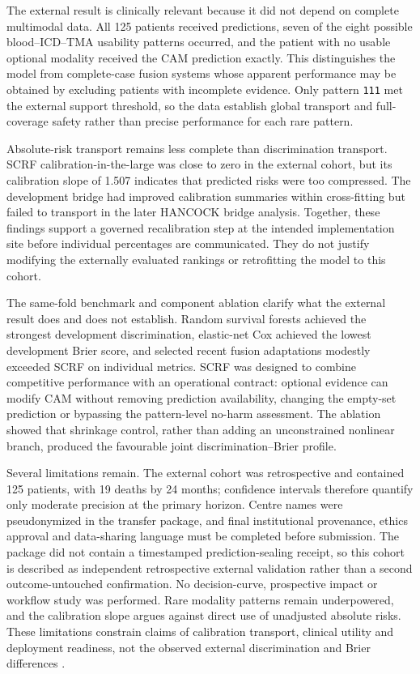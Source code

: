 \documentclass[pdflatex,sn-nature]{sn-jnl}
\begin{document}
The external result is clinically relevant because it did not depend on complete multimodal data. All 125 patients received predictions, seven of the eight possible blood--ICD--TMA usability patterns occurred, and the patient with no usable optional modality received the CAM prediction exactly. This distinguishes the model from complete-case fusion systems whose apparent performance may be obtained by excluding patients with incomplete evidence. Only pattern \texttt{111} met the external support threshold, so the data establish global transport and full-coverage safety rather than precise performance for each rare pattern.

Absolute-risk transport remains less complete than discrimination transport. SCRF calibration-in-the-large was close to zero in the external cohort, but its calibration slope of 1.507 indicates that predicted risks were too compressed. The development bridge had improved calibration summaries within cross-fitting but failed to transport in the later HANCOCK bridge analysis. Together, these findings support a governed recalibration step at the intended implementation site before individual percentages are communicated. They do not justify modifying the externally evaluated rankings or retrofitting the model to this cohort.

The same-fold benchmark and component ablation clarify what the external result does and does not establish. Random survival forests achieved the strongest development discrimination, elastic-net Cox achieved the lowest development Brier score, and selected recent fusion adaptations modestly exceeded SCRF on individual metrics. SCRF was designed to combine competitive performance with an operational contract: optional evidence can modify CAM without removing prediction availability, changing the empty-set prediction or bypassing the pattern-level no-harm assessment. The ablation showed that shrinkage control, rather than adding an unconstrained nonlinear branch, produced the favourable joint discrimination--Brier profile.

Several limitations remain. The external cohort was retrospective and contained 125 patients, with 19 deaths by 24 months; confidence intervals therefore quantify only moderate precision at the primary horizon. Centre names were pseudonymized in the transfer package, and final institutional provenance, ethics approval and data-sharing language must be completed before submission. The package did not contain a timestamped prediction-sealing receipt, so this cohort is described as independent retrospective external validation rather than a second outcome-untouched confirmation. No decision-curve, prospective impact or workflow study was performed. Rare modality patterns remain underpowered, and the calibration slope argues against direct use of unadjusted absolute risks. These limitations constrain claims of calibration transport, clinical utility and deployment readiness, not the observed external discrimination and Brier differences \cite{riley2020,riley2024}.
\end{document}
